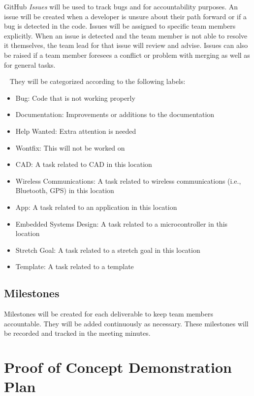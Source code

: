 \documentclass{article}
\begin{document}
GitHub \emph{Issues} will be used to track bugs and for accountability purposes. An issue will be created when a developer is unsure about their path forward or if a bug is detected in the code. Issues will be assigned to specific team members explicitly. When an issue is detected and the team member is not able to resolve it themselves, the team lead for that issue will review and advise. Issues can also be raised if a team member foresees a conflict or problem with merging as well as for general tasks. 

~\newline
They will be categorized according to the following labels:

\begin{itemize}

\item Bug: Code that is not working properly
\item Documentation: Improvements or additions to the documentation
\item Help Wanted: Extra attention is needed
\item Wontfix: This will not be worked on
\item CAD: A task related to CAD in this location
\item Wireless Communications: A task related to wireless communications (i.e., Bluetooth, GPS) in this location
\item App: A task related to an application in this location
\item Embedded Systems Design: A task related to a microcontroller in this location
\item Stretch Goal: A task related to a stretch goal in this location
\item Template: A task related to a template
\end{itemize}

\subsection{Milestones}

Milestones will be created for each deliverable to keep team members accountable.  They will be added continuously as necessary. These milestones will be recorded and tracked in the meeting minutes.

\section{Proof of Concept Demonstration Plan}
\end{document}
